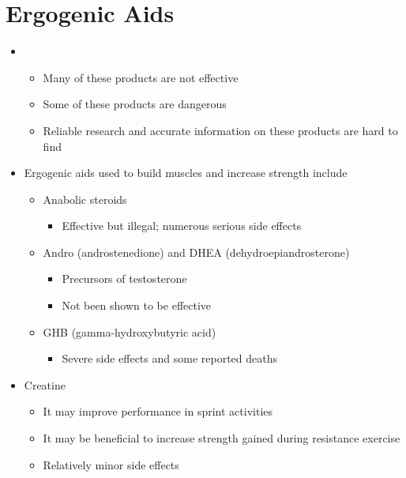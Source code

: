 \documentclass[title={Chapter 11}]{fdsn201notes}
\begin{document}
\section{Ergogenic Aids}\label{sec:ergogenic-aids}
\begin{itemize}
	\item {}
	\begin{itemize}
		\item Many of these products are not effective
		\item Some of these products are dangerous
		\item Reliable research and accurate information on these products are hard to find
	\end{itemize}
	\item Ergogenic aids used to build muscles and increase strength include
	\begin{itemize}
		\item Anabolic steroids
		\begin{itemize}
			\item Effective but illegal; numerous serious side effects
		\end{itemize}
	\end{itemize}
	\begin{itemize}
		\item Andro (androstenedione) and DHEA (dehydroepiandrosterone)
		\begin{itemize}
			\item Precursors of testosterone
			\item Not been shown to be effective
		\end{itemize}
	\end{itemize}
	\begin{itemize}
		\item GHB (gamma-hydroxybutyric acid)
		\begin{itemize}
			\item Severe side effects and some reported deaths
		\end{itemize}
	\end{itemize}
	\item Creatine
	\begin{itemize}
		\item It may improve performance in sprint activities
		\item It may be beneficial to increase strength gained during resistance exercise
		\item Relatively minor side effects

\end{itemize}
\end{itemize}
\end{document}
